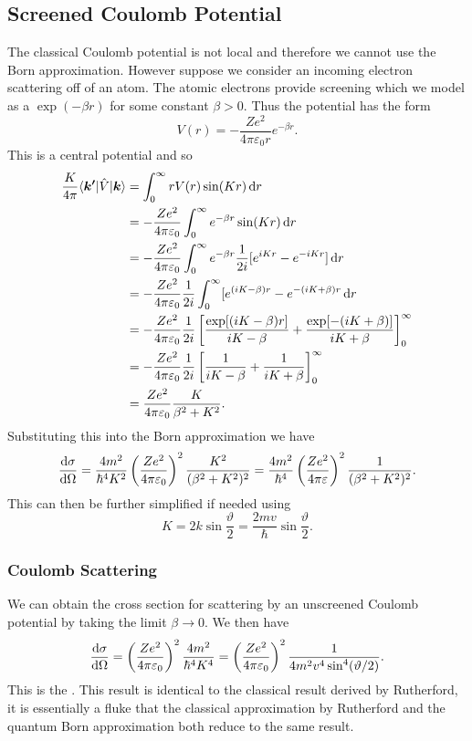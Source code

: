 \documentclass[a4paper]{article}
\renewcommand{\ket}[1]{\vert {#1} \rangle}
\renewcommand{\bra}[1]{\langle {#1} \vert}
\begin{document}
    \subsection{Screened Coulomb Potential}
    The classical Coulomb potential is not local and therefore we cannot use the Born approximation.
    However suppose we consider an incoming electron scattering off of an atom.
    The atomic electrons provide screening which we model as a  \(\exp(-\beta r)\) for some constant \(\beta > 0\).
    Thus the potential has the form
    \[V(r) = -\frac{Ze^2}{4\pi\varepsilon_0r} e^{-\beta r}.\]
    This is a central potential and so
    \begin{align*}
        \frac{K}{4\pi} \bra{\vv{k'}} \operator{V} \ket{\vv{k}} &= \int_{0}^{\infty} rV(r) \sin(Kr)\dd{r}\\
        &= -\frac{Ze^2}{4\pi\varepsilon_0} \int_{0}^{\infty} e^{-\beta r}\sin(Kr)\dd{r}\\
        &= -\frac{Ze^2}{4\pi\varepsilon_0} \int_{0}^{\infty} e^{-\beta r}\frac{1}{2i}[e^{iKr} - e^{-iKr}]\dd{r}\\
        &= -\frac{Ze^2}{4\pi\varepsilon_0} \frac{1}{2i} \int_{0}^{\infty} [e^{(iK - \beta)r} - e^{-(iK + \beta)r}\dd{r}\\
        &= -\frac{Ze^2}{4\pi\varepsilon_0} \frac{1}{2i} \left[ \frac{\exp[(iK - \beta)r]}{iK - \beta} + \frac{\exp[-(iK + \beta)]}{iK + \beta} \right]_{0}^{\infty}\\
        &= -\frac{Ze^2}{4\pi\varepsilon_0} \frac{1}{2i} \left[ \frac{1}{iK - \beta} + \frac{1}{iK + \beta} \right]_{0}^{\infty}\\
        &= \frac{Ze^2}{4\pi\varepsilon_0} \frac{K}{\beta^2 + K^2}.
    \end{align*}
    Substituting this into the Born approximation we have
    \[\dv{\sigma}{\Omega} = \frac{4m^2}{\hbar^4 K^2}\left( \frac{Ze^2}{4\pi\varepsilon_0} \right)^2 \frac{K^2}{(\beta^2 + K^2)^2} = \frac{4m^2}{\hbar^4} \left( \frac{Ze^2}{4\pi\varepsilon} \right)^2 \frac{1}{(\beta^2 + K^2)^2}.\]
    This can then be further simplified if needed using
    \[K = 2k\sin\frac{\vartheta}{2} = \frac{2mv}{\hbar}\sin\frac{\vartheta}{2}.\]
    
    \subsubsection{Coulomb Scattering}
    We can obtain the cross section for scattering by an unscreened Coulomb potential by taking the limit \(\beta \to 0\).
    We then have
    \[\dv{\sigma}{\Omega} = \left( \frac{Ze^2}{4\pi\varepsilon_0} \right)^2 \frac{4m^2}{\hbar^4K^4} = \left( \frac{Ze^2}{4\pi\varepsilon_0} \right)^2 \frac{1}{4m^2v^4 \sin^4(\vartheta/2)}.\]
    This is the .
    This result is identical to the classical result derived by Rutherford, it is essentially a fluke that the classical approximation by Rutherford and the quantum Born approximation both reduce to the same result.
    
\end{document}
